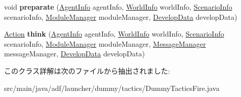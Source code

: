 \begin{DoxyCompactItemize}
\item 
\hypertarget{classadf_1_1launcher_1_1dummy_1_1tactics_1_1DummyTacticsFire_a12abee7c65713588f85d350ec60c6566}{}\label{classadf_1_1launcher_1_1dummy_1_1tactics_1_1DummyTacticsFire_a12abee7c65713588f85d350ec60c6566} 
void {\bfseries preparate} (\hyperlink{classadf_1_1agent_1_1info_1_1AgentInfo}{Agent\+Info} agent\+Info, \hyperlink{classadf_1_1agent_1_1info_1_1WorldInfo}{World\+Info} world\+Info, \hyperlink{classadf_1_1agent_1_1info_1_1ScenarioInfo}{Scenario\+Info} scenario\+Info, \hyperlink{classadf_1_1agent_1_1module_1_1ModuleManager}{Module\+Manager} module\+Manager, \hyperlink{classadf_1_1agent_1_1develop_1_1DevelopData}{Develop\+Data} develop\+Data)
\item 
\hypertarget{classadf_1_1launcher_1_1dummy_1_1tactics_1_1DummyTacticsFire_a992422564c275d1ab19d63ece7bbe142}{}\label{classadf_1_1launcher_1_1dummy_1_1tactics_1_1DummyTacticsFire_a992422564c275d1ab19d63ece7bbe142} 
\hyperlink{classadf_1_1agent_1_1action_1_1Action}{Action} {\bfseries think} (\hyperlink{classadf_1_1agent_1_1info_1_1AgentInfo}{Agent\+Info} agent\+Info, \hyperlink{classadf_1_1agent_1_1info_1_1WorldInfo}{World\+Info} world\+Info, \hyperlink{classadf_1_1agent_1_1info_1_1ScenarioInfo}{Scenario\+Info} scenario\+Info, \hyperlink{classadf_1_1agent_1_1module_1_1ModuleManager}{Module\+Manager} module\+Manager, \hyperlink{classadf_1_1agent_1_1communication_1_1MessageManager}{Message\+Manager} message\+Manager, \hyperlink{classadf_1_1agent_1_1develop_1_1DevelopData}{Develop\+Data} develop\+Data)
\end{DoxyCompactItemize}


このクラス詳解は次のファイルから抽出されました\+:\begin{DoxyCompactItemize}
\item 
src/main/java/adf/launcher/dummy/tactics/Dummy\+Tactics\+Fire.\+java\end{DoxyCompactItemize}
